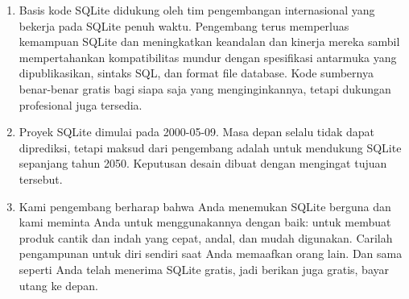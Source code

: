 \begin{enumerate}
				\item Basis kode SQLite didukung oleh tim pengembangan internasional yang bekerja pada SQLite penuh waktu. Pengembang terus memperluas kemampuan SQLite dan meningkatkan keandalan dan kinerja mereka sambil mempertahankan kompatibilitas mundur dengan spesifikasi antarmuka yang dipublikasikan, sintaks SQL, dan format file database. Kode sumbernya benar-benar gratis bagi siapa saja yang menginginkannya, tetapi dukungan profesional juga tersedia.
				\item Proyek SQLite dimulai pada 2000-05-09. Masa depan selalu tidak dapat diprediksi, tetapi maksud dari pengembang adalah untuk mendukung SQLite sepanjang tahun 2050. Keputusan desain dibuat dengan mengingat tujuan tersebut.
				\item Kami pengembang berharap bahwa Anda menemukan SQLite berguna dan kami meminta Anda untuk menggunakannya dengan baik: untuk membuat produk cantik dan indah yang cepat, andal, dan mudah digunakan. Carilah pengampunan untuk diri sendiri saat Anda memaafkan orang lain. Dan sama seperti Anda telah menerima SQLite gratis, jadi berikan juga gratis, bayar utang ke depan.
			\end{enumerate}
			
\cite{owens2010sqlite}
\cite{newman2004sqlite}
\cite{kreibich2010using}
\cite{kang2013x}
\cite{jeon2012recovery}
\cite{lee2012creating}


